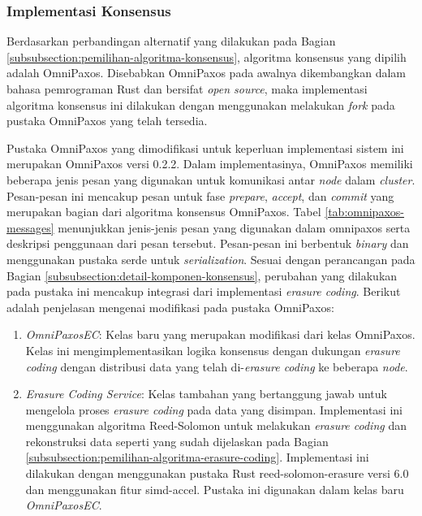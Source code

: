 \subsubsection{Implementasi Konsensus}
\label{subsubsection:implementasi-konsensus}

Berdasarkan perbandingan alternatif yang dilakukan pada Bagian \ref{subsubsection:pemilihan-algoritma-konsensus}, algoritma konsensus yang dipilih adalah OmniPaxos. Disebabkan OmniPaxos pada awalnya dikembangkan dalam bahasa pemrograman Rust dan bersifat \textit{open source}, maka implementasi algoritma konsensus ini dilakukan dengan menggunakan melakukan \textit{fork} pada pustaka OmniPaxos yang telah tersedia.

Pustaka OmniPaxos yang dimodifikasi untuk keperluan implementasi sistem ini merupakan OmniPaxos versi 0.2.2. Dalam implementasinya, OmniPaxos memiliki beberapa jenis pesan yang digunakan untuk komunikasi antar \textit{node} dalam \textit{cluster}. Pesan-pesan ini mencakup pesan untuk fase \textit{prepare}, \textit{accept}, dan \textit{commit} yang merupakan bagian dari algoritma konsensus OmniPaxos. Tabel \ref{tab:omnipaxos-messages} menunjukkan jenis-jenis pesan yang digunakan dalam omnipaxos serta deskripsi penggunaan dari pesan tersebut. Pesan-pesan ini berbentuk \textit{binary} dan menggunakan pustaka serde untuk \textit{serialization}.
Sesuai dengan perancangan pada Bagian \ref{subsubsection:detail-komponen-konsensus}, perubahan yang dilakukan pada pustaka ini mencakup integrasi dari implementasi \textit{erasure coding}. Berikut adalah penjelasan mengenai modifikasi pada pustaka OmniPaxos:

\begin{enumerate}
  \item \textit{OmniPaxosEC}: Kelas baru yang merupakan modifikasi dari kelas OmniPaxos. Kelas ini mengimplementasikan logika konsensus dengan dukungan \textit{erasure coding} dengan distribusi data yang telah di-\textit{erasure coding} ke beberapa \textit{node}. 
  \item \textit{Erasure Coding Service}: Kelas tambahan yang bertanggung jawab untuk mengelola proses \textit{erasure coding} pada data yang disimpan. Implementasi ini menggunakan algoritma Reed-Solomon untuk melakukan \textit{erasure coding} dan rekonstruksi data seperti yang sudah dijelaskan pada Bagian \ref{subsubsection:pemilihan-algoritma-erasure-coding}. Implementasi ini dilakukan dengan menggunakan pustaka Rust reed-solomon-erasure versi 6.0 dan menggunakan fitur simd-accel. Pustaka ini digunakan dalam kelas baru \textit{OmniPaxosEC}.
\end{enumerate}

